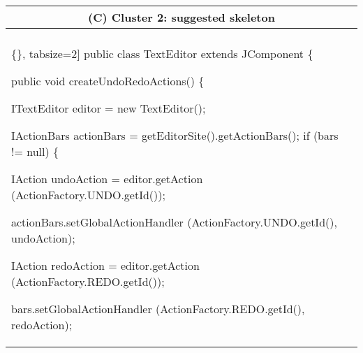 \begin{figure*}[!htb]
 \begin{minipage}{0.5\textwidth}
\scriptsize 
\begin{tabular}{@{}p{}} 
 \hline 
  \multicolumn{1}{c}{(C) Cluster 2: suggested skeleton} \\ \hline
  \vspace{-4mm}
\begin{Verbatim}[commandchars=\\\{\}, tabsize=2]
public class TextEditor extends JComponent \{











   public void createUndoRedoActions() \{   
   
     ITextEditor editor = new TextEditor();
     
     
     IActionBars actionBars = getEditorSite().getActionBars();
     if (bars != null) \{
     
       IAction undoAction = editor.getAction
         (ActionFactory.UNDO.getId());
         
         
       actionBars.setGlobalActionHandler
         (ActionFactory.UNDO.getId(), undoAction);
         
         
         
       IAction redoAction = editor.getAction
         (ActionFactory.REDO.getId());
         
         
         
       bars.setGlobalActionHandler
          (ActionFactory.REDO.getId(), redoAction);
          

\end{Verbatim}
\end{tabular}
\end{minipage}
\end{figure*}
